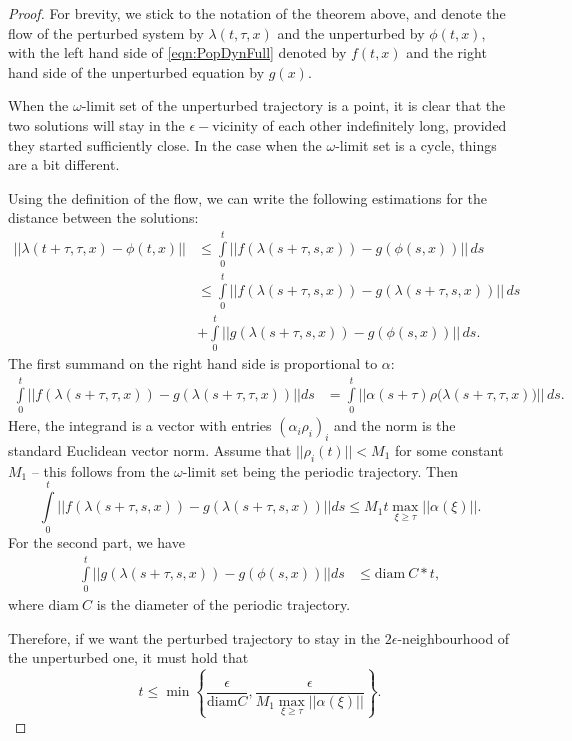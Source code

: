 \documentclass[10pt,a4paper]{amsart}
\begin{document}
\begin{proof}
For brevity, we stick to the notation of the theorem above, and denote the flow of the perturbed system by $\lambda(t,\tau,x)$ and the unperturbed by $\phi(t,x)$, with the left hand side of \eqref{eqn:PopDynFull} denoted by $f(t,x)$ and the right hand side of the unperturbed equation by $g(x)$.

When the $\omega$-limit set of the unperturbed trajectory is a point, it is clear that the two solutions will stay in the $\epsilon-$vicinity of each other indefinitely long, provided they started sufficiently close. In the case when the $\omega$-limit set is a cycle, things are a bit different. 

Using the definition of the flow, we can write the following estimations for the distance between the solutions:
\begin{equation*}
    \begin{split}
        ||\lambda(t + \tau, \tau,x) - \phi(t,x)||&\le \int\limits_0^t ||f(\lambda(s + \tau,s,x)) -g(\phi(s,x))||\,d s\\&\le\int\limits_0^t ||f(\lambda(s + \tau,s,x)) -g(\lambda(s + \tau,s,x))||\,d s \\&+ \int\limits_0^t ||g(\lambda(s + \tau,s,x)) -g(\phi(s,x))||\, d s.
    \end{split}
\end{equation*}
The first summand on the right hand side is proportional to $\alpha:$
\begin{equation*}
    \begin{split}
       \int\limits_0^t ||f(\lambda(s + \tau,\tau,x)) -g(\lambda(s + \tau,\tau,x))||d s & = \int\limits_0^t||\alpha(s + \tau)\rho(\lambda(s + \tau,\tau,x){)} ||\, d s.
    \end{split}
\end{equation*}
Here, the integrand is a vector with entries $(\alpha_i {\rho}_i)_i$ and the norm is the standard Euclidean vector norm.  Assume that $||{\rho}_i(t)||<M_1$ for some constant $M_1$ -- this follows from the $\omega$-limit set being the periodic trajectory. Then 
\[
\int\limits_0^t ||f(\lambda(s + \tau,s,x)) -g(\lambda(s + \tau,s,x))||d s \le M_1 t \max_{\xi\ge \tau}||\alpha(\xi)||. 
\]
For the second part, we have 
\begin{equation*}
    \begin{split}
       \int\limits_0^t ||g(\lambda(s + \tau,s,x)) -g(\phi(s,x))||d s&\le \mathrm{diam}\ C*t ,
    \end{split}
\end{equation*}
where $\mathrm{diam}\ C$ is the diameter of the periodic trajectory. 

Therefore, if we want the perturbed trajectory to stay in the $2\epsilon$-neighbourhood of the unperturbed one, it must hold that 
\[
t\le \min\left\{\frac{\epsilon}{\mathrm{diam} C}, \frac{\epsilon}{M_1\max_{\xi\ge\tau}||\alpha(\xi)||}\right\}.
\]
\end{proof}
\end{document}
